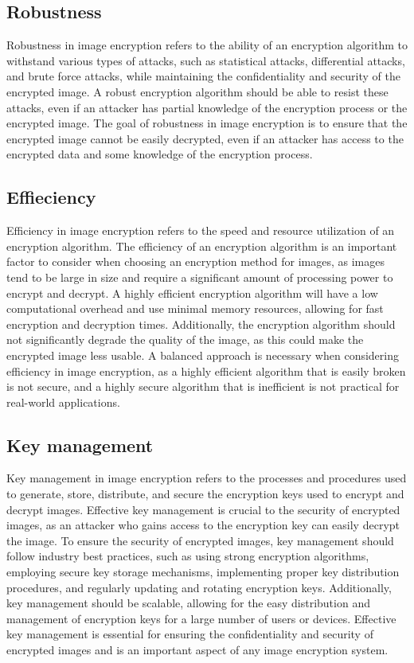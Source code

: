 \documentclass[11pt,a4paper,english]{article}
\begin{document}
\subsection{Robustness}Robustness in image encryption refers to the ability of an encryption algorithm to withstand various types of attacks, such as statistical attacks, differential attacks, and brute force attacks, while maintaining the confidentiality and security of the encrypted image. A robust encryption algorithm should be able to resist these attacks, even if an attacker has partial knowledge of the encryption process or the encrypted image. The goal of robustness in image encryption is to ensure that the encrypted image cannot be easily decrypted, even if an attacker has access to the encrypted data and some knowledge of the encryption process.
\subsection{Effieciency}Efficiency in image encryption refers to the speed and resource utilization of an encryption algorithm. The efficiency of an encryption algorithm is an important factor to consider when choosing an encryption method for images, as images tend to be large in size and require a significant amount of processing power to encrypt and decrypt. A highly efficient encryption algorithm will have a low computational overhead and use minimal memory resources, allowing for fast encryption and decryption times. Additionally, the encryption algorithm should not significantly degrade the quality of the image, as this could make the encrypted image less usable. A balanced approach is necessary when considering efficiency in image encryption, as a highly efficient algorithm that is easily broken is not secure, and a highly secure algorithm that is inefficient is not practical for real-world applications.
\subsection{Key management}Key management in image encryption refers to the processes and procedures used to generate, store, distribute, and secure the encryption keys used to encrypt and decrypt images. Effective key management is crucial to the security of encrypted images, as an attacker who gains access to the encryption key can easily decrypt the image. To ensure the security of encrypted images, key management should follow industry best practices, such as using strong encryption algorithms, employing secure key storage mechanisms, implementing proper key distribution procedures, and regularly updating and rotating encryption keys. Additionally, key management should be scalable, allowing for the easy distribution and management of encryption keys for a large number of users or devices. Effective key management is essential for ensuring the confidentiality and security of encrypted images and is an important aspect of any image encryption system.
\end{document}
